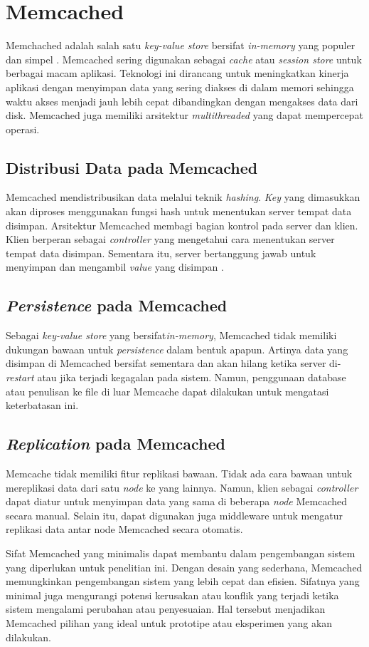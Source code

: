 \section{Memcached}

Memchached adalah salah satu \textit{key-value store} bersifat \textit{in-memory} yang populer dan simpel \parencite{nishtala2013scaling}. Memcached sering digunakan sebagai \textit{cache} atau \textit{session store} untuk berbagai macam aplikasi. Teknologi ini dirancang untuk meningkatkan kinerja aplikasi dengan menyimpan data yang sering diakses di dalam memori sehingga waktu akses menjadi jauh lebih cepat dibandingkan dengan mengakses data dari disk. Memcached juga memiliki arsitektur \textit{multithreaded} yang dapat mempercepat operasi.

\subsection{Distribusi Data pada Memcached}
Memcached mendistribusikan data melalui teknik \textit{hashing}. \textit{Key} yang dimasukkan akan diproses menggunakan fungsi hash untuk menentukan server tempat data disimpan. Arsitektur Memcached membagi bagian kontrol pada server dan klien. Klien berperan sebagai \textit{controller} yang mengetahui cara menentukan server tempat data disimpan. Sementara itu, server bertanggung jawab untuk menyimpan dan mengambil \textit{value} yang disimpan \parencite{memcached_documentation}.

\subsection{\textit{Persistence} pada Memcached}
Sebagai \textit{key-value store} yang bersifat\textit{in-memory}, Memcached tidak memiliki dukungan bawaan untuk \textit{persistence} dalam bentuk apapun. Artinya data yang disimpan di Memcached bersifat sementara dan akan hilang ketika server di-\textit{restart} atau jika terjadi kegagalan pada sistem. Namun, penggunaan database atau penulisan ke file di luar Memcache dapat dilakukan untuk mengatasi keterbatasan ini.

\subsection{\textit{Replication} pada Memcached}
Memcache tidak memiliki fitur replikasi bawaan. Tidak ada cara bawaan untuk mereplikasi data dari satu \textit{node} ke yang lainnya. Namun, klien sebagai \textit{controller} dapat diatur untuk menyimpan data yang sama di beberapa \textit{node} Memcached secara manual. Selain itu, dapat digunakan juga middleware untuk mengatur replikasi data antar node Memcached secara otomatis.

Sifat Memcached yang minimalis dapat membantu dalam pengembangan sistem yang diperlukan untuk penelitian ini. Dengan desain yang sederhana, Memcached memungkinkan pengembangan sistem yang lebih cepat dan efisien. Sifatnya yang minimal juga mengurangi potensi kerusakan atau konflik yang terjadi ketika sistem mengalami perubahan atau penyesuaian. Hal tersebut menjadikan Memcached pilihan yang ideal untuk prototipe atau eksperimen yang akan dilakukan.
